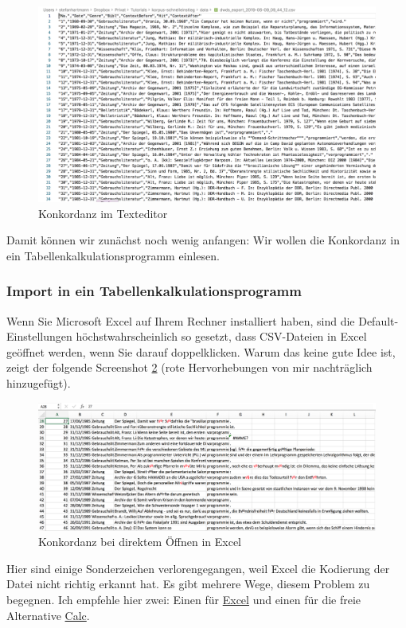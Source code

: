 \documentclass[]{article}
\begin{document}
\begin{figure}
\includegraphics[width=4.86in]{docs/fig/conc_in_editor} \caption{Konkordanz im Texteditor}\label{fig:dwdseditor}
\end{figure}

Damit können wir zunächst noch wenig anfangen: Wir wollen die Konkordanz
in ein Tabellenkalkulationsprogramm einlesen.

\subsubsection{Import in ein
Tabellenkalkulationsprogramm}\label{import-in-ein-tabellenkalkulationsprogramm}

Wenn Sie Microsoft Excel auf Ihrem Rechner installiert haben, sind die
Default-Einstellungen höchstwahrscheinlich so gesetzt, dass CSV-Dateien
in Excel geöffnet werden, wenn Sie darauf doppelklicken. Warum das keine
gute Idee ist, zeigt der folgende Screenshot \ref{fig:excel1} (rote
Hervorhebungen von mir nachträglich hinzugefügt).

\begin{figure}
\includegraphics[width=5.04in]{docs/fig/conc_in_excel_bad} \caption{Konkordanz bei direktem Öffnen in Excel}\label{fig:excel1}
\end{figure}

Hier sind einige Sonderzeichen verlorengegangen, weil Excel die
Kodierung der Datei nicht richtig erkannt hat. Es gibt mehrere Wege,
diesem Problem zu begegnen. Ich empfehle hier zwei: Einen für
\protect\hyperlink{import-in-excel}{Excel} und einen für die freie
Alternative \protect\hyperlink{import-in-calc}{Calc}.
\end{document}
